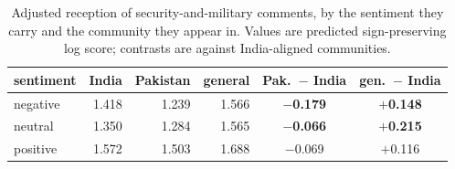 \begin{table}[H]
\centering
\caption{Adjusted reception of security-and-military comments, by the sentiment
they carry and the community they appear in. Values are predicted
sign-preserving log score; contrasts are against India-aligned communities.}
\label{tab:reward}
\setlength{\tabcolsep}{5pt}
\begin{tabularx}{0.8\linewidth}{@{}>{\raggedright\arraybackslash}Xrrrcc@{}}
\toprule
sentiment & India & Pakistan & general & Pak.\ $-$ India & gen.\ $-$ India \\
\midrule
negative & 1.418 & 1.239 & 1.566 & \textbf{$-$0.179} & \textbf{$+$0.148} \\
neutral  & 1.350 & 1.284 & 1.565 & \textbf{$-$0.066} & \textbf{$+$0.215} \\
positive & 1.572 & 1.503 & 1.688 & $-$0.069 & $+$0.116 \\
\bottomrule
\end{tabularx}
\end{table}
